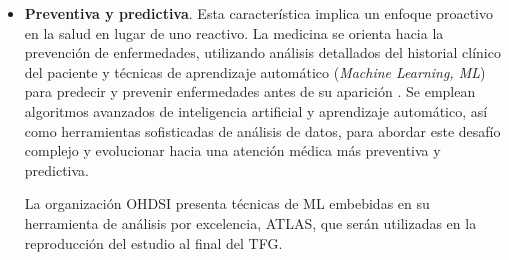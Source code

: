 \begin{itemize}



\item \textbf{Preventiva y predictiva}. Esta característica implica un enfoque proactivo en la salud en lugar de uno reactivo. La medicina se orienta hacia la prevención de enfermedades, utilizando análisis detallados del historial clínico del paciente y técnicas de aprendizaje automático (\textit{Machine Learning, ML}) para predecir y prevenir enfermedades antes de su aparición \cite{ruiz2023inteligencia}. Se emplean algoritmos avanzados de inteligencia artificial y aprendizaje automático, así como herramientas sofisticadas de análisis de datos, para abordar este desafío complejo y evolucionar hacia una atención médica más preventiva y predictiva.

La organización OHDSI presenta técnicas de ML embebidas en su herramienta de análisis por excelencia, ATLAS, que serán utilizadas en la reproducción del estudio al final del TFG.

\end{itemize}

